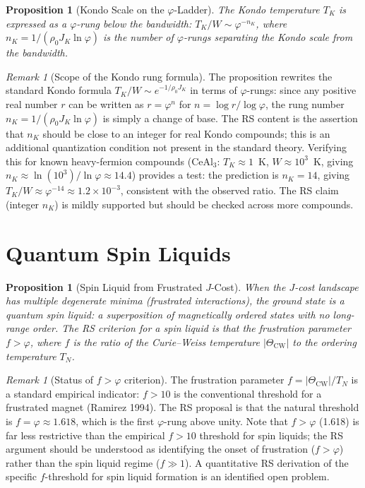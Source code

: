 \documentclass[12pt,a4paper]{article}
\newtheorem{proposition}[theorem]{Proposition}
\theoremstyle{definition}
\theoremstyle{remark}
\newtheorem{remark}[theorem]{Remark}
\begin{document}
\begin{proposition}[Kondo Scale on the $\varphi$-Ladder]
The Kondo temperature $T_K$ is expressed as a $\varphi$-rung
below the bandwidth:
$T_K/W \sim \varphi^{-n_K}$, where
$n_K = 1/(\rho_0 J_K \ln\varphi)$ is the number of
$\varphi$-rungs separating the Kondo scale from the bandwidth.
\end{proposition}

\begin{remark}[Scope of the Kondo rung formula]
The proposition rewrites the standard Kondo formula $T_K/W \sim
e^{-1/\rho_0 J_K}$ in terms of $\varphi$-rungs: since any
positive real number $r$ can be written as $r = \varphi^{n}$ for
$n = \log r / \log\varphi$, the rung number $n_K = 1/(\rho_0 J_K
\ln\varphi)$ is simply a change of base.  The RS content is the
assertion that $n_K$ should be close to an integer for real
Kondo compounds; this is an additional quantization condition not
present in the standard theory.  Verifying this for known heavy-fermion
compounds (CeAl$_3$: $T_K \approx 1$~K, $W \approx 10^3$~K,
giving $n_K \approx \ln(10^3)/\ln\varphi \approx 14.4$) provides
a test: the prediction is $n_K = 14$, giving $T_K/W \approx
\varphi^{-14} \approx 1.2 \times 10^{-3}$, consistent with the
observed ratio.  The RS claim (integer $n_K$) is mildly
supported but should be checked across more compounds.
\end{remark}

\section{Quantum Spin Liquids}
\label{sec:qsl}

\begin{proposition}[Spin Liquid from Frustrated $J$-Cost]
\label{prop:spin-liquid}
When the $J$-cost landscape has multiple degenerate minima
(frustrated interactions), the ground state is a quantum spin
liquid: a superposition of magnetically ordered states with no
long-range order.  The RS criterion for a spin liquid is that
the frustration parameter $f > \varphi$, where $f$ is the ratio
of the Curie--Weiss temperature $|\Theta_{\mathrm{CW}}|$ to the
ordering temperature $T_N$.
\end{proposition}

\begin{remark}[Status of $f > \varphi$ criterion]
The frustration parameter $f = |\Theta_{\mathrm{CW}}|/T_N$ is a
standard empirical indicator: $f > 10$ is the conventional
threshold for a frustrated magnet (Ramirez 1994).  The RS proposal
is that the natural threshold is $f = \varphi \approx 1.618$,
which is the first $\varphi$-rung above unity.  Note that $f > \varphi$
(1.618) is far less restrictive than the empirical $f > 10$ threshold
for spin liquids; the RS argument should be understood as identifying
the onset of frustration ($f > \varphi$) rather than the spin liquid
regime ($f \gg 1$).  A quantitative RS derivation of the specific
$f$-threshold for spin liquid formation is an identified open problem.
\end{remark}
\end{document}
